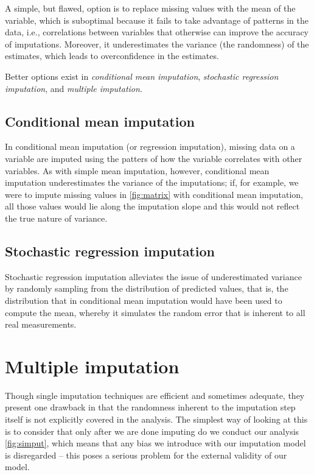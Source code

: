 \documentclass[headinclude=true, headsepline=true, DIV14]{scrartcl}\usepackage[]{graphicx}\usepackage[]{color}
\begin{document}
A simple, but flawed, option is to replace missing values with the mean of the
variable, which is suboptimal because it fails to take advantage of patterns in
the data, i.e., correlations between variables that otherwise can improve the
accuracy of imputations. Moreover, it underestimates the variance (the
randomness) of the estimates, which leads to overconfidence in the estimates.

Better options exist in \emph{conditional mean imputation}, 
\emph{stochastic regression imputation}, and \emph{multiple imputation}.

\subsection{Conditional mean imputation}

In conditional mean imputation (or regression imputation), missing data on a
variable are imputed using the patters of how the variable correlates with
other variables. As with simple mean imputation, however, conditional mean
imputation underestimates the variance of the imputations; if, for example,
we were to impute missing values in \autoref{fig:matrix} with conditional
mean imputation, all those values would lie along the imputation slope and this
would not reflect the true nature of variance.

\subsection{Stochastic regression imputation}

Stochastic regression imputation alleviates the issue of underestimated variance
by randomly sampling from the distribution of predicted values, that is, the
distribution that in conditional mean imputation would have been used to 
compute the mean, whereby it simulates the random error that is inherent to
all real measurements.

\section{Multiple imputation}

Though single imputation techniques are efficient and sometimes adequate, they 
present one drawback in that the randomness inherent to
the imputation step itself is not explicitly covered in the analysis. The 
simplest way of looking at this is to consider that only after we are done
imputing do we conduct our analysis \ref{fig:simput}, which means that any
bias we introduce with our imputation model is disregarded -- this poses a
serious problem for the external validity of our model.
\end{document}
